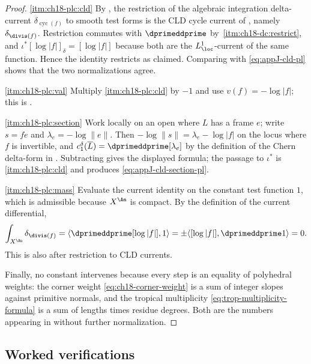 \begin{proof}
\cref{itm:ch18-plc:cld} By
\cite[Example~6.11 and Remark~6.7]{GK17}, the restriction of the algebraic
integration delta-current $\delta_{\operatorname{cyc}(f)}$ to smooth test
forms is the CLD cycle current of
, namely $\delta_{\divis(f)}$.
Restriction commutes with $\dprimeddprime$ by
\,\cref{itm:ch18-dc:restrict}, and
$\iota^\ast[\log|f|]_\delta=[\log|f|]$ because both are the
$L^1_{\loc}$-current of the same function.  Hence the identity restricts as
claimed.  Comparing with \eqref{eq:appJ-cld-pl} shows that the two
normalizations agree.

\cref{itm:ch18-plc:val} Multiply \cref{itm:ch18-plc:cld} by $-1$ and use
$v(f)=-\log|f|$; this is .

\cref{itm:ch18-plc:section} Work locally on an open where $L$ has a frame
$e$; write $s=fe$ and $\lambda_e=-\log\|e\|$.  Then
$-\log\|s\|=\lambda_e-\log|f|$ on the locus where $f$ is invertible, and
$c_1^\delta(\overline L)=\dprimeddprime[\lambda_e]$ by the definition of the
Chern delta-form in .  Subtracting
 gives the displayed formula; the passage to
$\iota^\ast$ is \cref{itm:ch18-plc:cld} and produces
\eqref{eq:appJ-cld-section-pl}.

\cref{itm:ch18-plc:mass} Evaluate the current identity on the constant test
function $1$, which is admissible because $X^{\An}$ is compact.  By the
definition of the current differential,
\[
 \int_{X^{\An}}\delta_{\divis(f)}
 =\langle\dprimeddprime[\log|f|],1\rangle
 =\pm\langle[\log|f|],\dprimeddprime1\rangle=0.
\]
This is also  after restriction to CLD currents.

Finally, no constant intervenes because every step is an equality of
polyhedral weights: the corner weight \eqref{eq:ch18-corner-weight} is a sum
of integer slopes against primitive normals, and the tropical multiplicity
\eqref{eq:trop-multiplicity-formula} is a sum of lengths times residue
degrees.  Both are the numbers appearing in
 without further normalization.
\end{proof}

\subsection{Worked verifications}
\label{sec:ch18-pl-examples}

